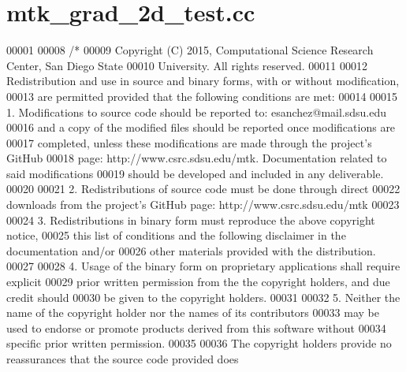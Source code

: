 \hypertarget{mtk__grad__2d__test_8cc_source}{\section{mtk\+\_\+grad\+\_\+2d\+\_\+test.\+cc}
\label{mtk__grad__2d__test_8cc_source}
}

\begin{DoxyCode}
00001 
00008 \textcolor{comment}{/*}
00009 \textcolor{comment}{Copyright (C) 2015, Computational Science Research Center, San Diego State}
00010 \textcolor{comment}{University. All rights reserved.}
00011 \textcolor{comment}{}
00012 \textcolor{comment}{Redistribution and use in source and binary forms, with or without modification,}
00013 \textcolor{comment}{are permitted provided that the following conditions are met:}
00014 \textcolor{comment}{}
00015 \textcolor{comment}{1. Modifications to source code should be reported to: esanchez@mail.sdsu.edu}
00016 \textcolor{comment}{and a copy of the modified files should be reported once modifications are}
00017 \textcolor{comment}{completed, unless these modifications are made through the project's GitHub}
00018 \textcolor{comment}{page: http://www.csrc.sdsu.edu/mtk. Documentation related to said modifications}
00019 \textcolor{comment}{should be developed and included in any deliverable.}
00020 \textcolor{comment}{}
00021 \textcolor{comment}{2. Redistributions of source code must be done through direct}
00022 \textcolor{comment}{downloads from the project's GitHub page: http://www.csrc.sdsu.edu/mtk}
00023 \textcolor{comment}{}
00024 \textcolor{comment}{3. Redistributions in binary form must reproduce the above copyright notice,}
00025 \textcolor{comment}{this list of conditions and the following disclaimer in the documentation and/or}
00026 \textcolor{comment}{other materials provided with the distribution.}
00027 \textcolor{comment}{}
00028 \textcolor{comment}{4. Usage of the binary form on proprietary applications shall require explicit}
00029 \textcolor{comment}{prior written permission from the the copyright holders, and due credit should}
00030 \textcolor{comment}{be given to the copyright holders.}
00031 \textcolor{comment}{}
00032 \textcolor{comment}{5. Neither the name of the copyright holder nor the names of its contributors}
00033 \textcolor{comment}{may be used to endorse or promote products derived from this software without}
00034 \textcolor{comment}{specific prior written permission.}
00035 \textcolor{comment}{}
00036 \textcolor{comment}{The copyright holders provide no reassurances that the source code provided does}

\end{DoxyCode}
